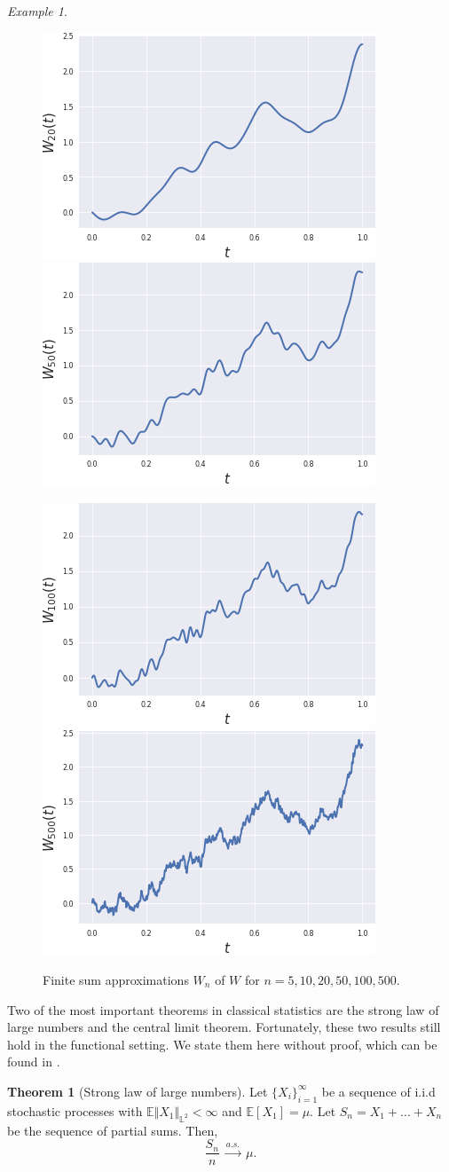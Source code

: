 \documentclass[10pt, a4paper]{report}
\newcommand{\E}[0]{\mathbb{E}}
\newcommand{\Ll}[0]{\mathbb{L}}
\theoremstyle{definition}
\newtheorem{theorem}{Theorem}
\theoremstyle{remark}
\newtheorem{ex}{Example}
\begin{document}
\begin{ex}
\begin{figure}[h]
		
		\includegraphics[width=.4\textwidth]{Code/images/12/approx21}
		\includegraphics[width=.4\textwidth]{Code/images/12/approx51}
		
		\medskip
		
		\includegraphics[width=.4\textwidth]{Code/images/12/approx101}\quad
		\includegraphics[width=.4\textwidth]{Code/images/12/approx501} \quad
		
		\caption{Finite sum approximations $W_n$ of $W$ for $n=5,10,20,50,100,500$.}
		\label{fig:wienerapprox}
	\end{figure}
\end{ex}
Two of the most important theorems in classical statistics are the strong law of large numbers and the central limit theorem. Fortunately, these two results still hold in the functional setting. We state them here without proof, which can be found in \cite[Theorem 7.7.2 and 7.7.6]{found}.
\begin{theorem}[Strong law of large numbers] 
		Let $\{X_i\}_{i=1}^\infty$ be a sequence of i.i.d stochastic processes with $\E\Vert X_1 \Vert_{\Ll^2}<\infty$ and $\E[X_1]=\mu$. Let $S_n=X_1 +...+X_n$ be the sequence of partial sums. Then,
		$$\frac{S_n}{n} \ \stackrel{a.s.}{\longrightarrow} \ \mu.$$  
\end{theorem}
\end{document}
